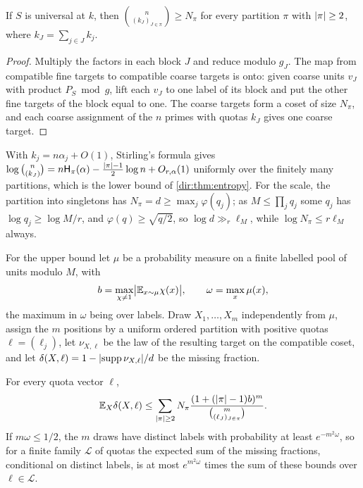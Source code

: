 \begin{proposition}\label{dir:prop:entropycount}
If $S$ is universal at $k$, then $\binom n{(k_J)_{J\in\pi}}\ge N_\pi$ for every partition $\pi$ with
$\lvert\pi\rvert\ge2$, where $k_J=\sum_{j\in J}k_j$.
\end{proposition}

\begin{proof}
Multiply the factors in each block $J$ and reduce modulo $g_J$. The map from compatible fine targets to
compatible coarse targets is onto: given coarse units $v_J$ with product $P_S\bmod g$, lift each $v_J$ to
one label of its block and put the other fine targets of the block equal to one. The coarse targets form
a coset of size $N_\pi$, and each coarse assignment of the $n$ primes with quotas $k_J$ gives one coarse
target.
\end{proof}

With $k_j=n\alpha_j+O(1)$, Stirling's formula gives
$\log\binom n{(k_J)}=n\mathsf H_\pi(\alpha)-\frac{\lvert\pi\rvert-1}2\log n+O_{r,\alpha}(1)$ uniformly over the finitely
many partitions, which is the lower bound of \cref{dir:thm:entropy}. For the scale, the partition into
singletons has $N_\pi=d\ge\max_j\varphi(q_j)$; as $M\le\prod_jq_j$ some $q_j$ has $\log q_j\ge\log M/r$, and
$\varphi(q)\ge\sqrt{q/2}$, so $\log d\gg_r\ell_M$, while $\log N_\pi\le r\ell_M$ always.

For the upper bound let $\mu$ be a probability measure on a finite labelled pool of units modulo $M$,
with
\[
 b=\max_{\chi\ne1}\bigl|\mathbb{E}_{x\sim\mu}\chi(x)\bigr|,\qquad\omega=\max_x\mu(x),
\]
the maximum in $\omega$ being over labels. Draw $X_1,\dots,X_m$ independently from $\mu$, assign the $m$
positions by a uniform ordered partition with positive quotas $\ell=(\ell_j)$, let $\nu_{X,\ell}$ be the law
of the resulting target on the compatible coset, and let $\delta(X,\ell)=1-\lvert\operatorname{supp}\nu_{X,\ell}\rvert/d$ be the
missing fraction.

\begin{lemma}\label{dir:lem:collision}
For every quota vector $\ell$,
\[
 \mathbb{E}_X\delta(X,\ell)\le\sum_{\lvert\pi\rvert\ge2}N_\pi\frac{(1+(\lvert\pi\rvert-1)b)^m}{\binom m{(\ell_J)_{J\in\pi}}} .
\]
If $m\omega\le1/2$, the $m$ draws have distinct labels with probability at least $e^{-m^2\omega}$, so for a
finite family $\mathcal L$ of quotas the expected sum of the missing fractions, conditional on distinct
labels, is at most $e^{m^2\omega}$ times the sum of these bounds over $\ell\in\mathcal L$.
\end{lemma}

